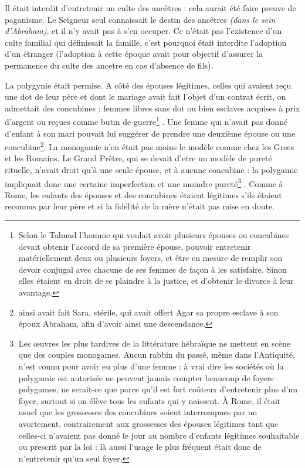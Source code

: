  Il était interdit d'entretenir un culte des ancêtres : cela aurait été faire preuve de paganisme. Le Seigneur seul connaissait le destin des ancêtres \emph{(dans le sein d'Abraham)}, et il n'y avait pas à s'en occuper. Ce n'était pas l'existence d'un culte familial qui définissait la famille, c'est pourquoi était interdite l'adoption d'un étranger (l'adoption à cette époque avait pour objectif d'assurer la permanence du culte des ancetre en cas d'absence de fils). 



La polygynie était permise. A côté des épouses légitimes, celles qui avaient reçu une dot de leur père et dont le mariage avait fait l'objet d'un contrat écrit, on admettait des concubines : femmes libres sans dot ou bien esclaves acquises à prix d'argent ou reçues comme butin de guerre\footnote{Selon le Talmud l'homme qui voulait avoir plusieurs épouses ou concubines devait obtenir l'accord de sa première épouse, pouvoir entretenir matériellement deux ou plusieurs foyers, et être en mesure de remplir son devoir conjugal avec chacune de ses femmes de façon à les satisfaire. Sinon elles étaient en droit de se plaindre à la justice, et d'obtenir le divorce à leur avantage.}%
. Une femme qui n'avait pas donné d'enfant à son mari pouvait lui suggérer de prendre une deuxième épouse ou une concubine\footnote{ainsi avait fait Sara, stérile, qui avait offert Agar sa propre esclave à son époux Abraham, afin d'avoir ainsi une descendance.}. La monogamie n'en était pas moins le modèle comme chez les Grecs et les Romains. Le Grand Prêtre, qui se devait d'etre un modèle de pureté rituelle, n'avait droit qu'à une seule épouse, et à aucune concubine : la polygamie impliquait donc une certaine imperfection et une moindre pureté\footnote{Les œuvres les plus tardives de la littérature hébraïque ne mettent en scène que des couples monogames. Aucun rabbin du passé, même dans l'Antiquité, n'est connu pour avoir eu plus d'une femme : à vrai dire les sociétés où la polygamie est autorisée ne peuvent jamais compter beaucoup de foyers polygames, ne serait-ce que parce qu'il est fort coûteux d'entretenir plus d'un foyer, surtout si on élève tous les enfants qui y naissent. À Rome, il était usuel que les grossesses des concubines soient interrompues par un avortement, contrairement aux grossesses des épouses légitimes tant que celles-ci n'avaient pas donné le jour au nombre d'enfants légitimes souhaitable ou prescrit par la loi : là aussi l'usage le plus fréquent était donc de n'entretenir qu'un seul foyer.}  . Comme à Rome, les enfants des épouses et des concubines étaient légitimes s'ils étaient reconnus par leur père et si la fidélité de la mère n'était pas mise en doute. 

